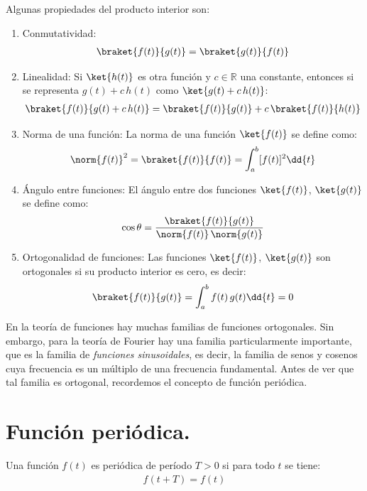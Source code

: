 Algunas propiedades del producto interior son:
\begin{enumerate}[label=\roman*)]
\item Conmutatividad:
\begin{align}
\braket{f(t)}{g(t)} = \braket{g(t)}{f(t)}
\label{eq:ecuacion_06_01_14}
\end{align}
\item Linealidad: Si $\ket{h(t)}$ es otra función y $c \in \mathbb{R}$ una constante, entonces si se representa $g(t) + c \, h(t)$ como $\ket{g(t) + c \, h(t)}$:
\begin{align}
\braket{f(t)}{g(t) + c \, h(t)} = \braket{f(t)}{g(t)} + c \, \braket{f(t)}{h(t)}
\label{eq:ecuacion_06_01_15}
\end{align}
\item Norma de una función: La norma de una función $\ket{f(t)}$ se define como:
\begin{align}
\norm{f(t)}^{2} = \braket{f(t)}{f(t)} = \int_{a}^{b} [f(t)]^{2} \dd{t}
\label{eq:ecuacion_01_06_16}
\end{align}
\item Ángulo entre funciones: El ángulo entre dos funciones $\ket{f(t)}$, $\ket{g(t)}$ se define como:
\begin{align}
\cos \theta = \dfrac{\braket{f(t)}{g(t)}}{\norm{f(t)} \, \norm{g(t)}}
\label{eq:ecuacion_06_01_17}
\end{align}
\item Ortogonalidad de funciones: Las funciones $\ket{f(t)}$, $\ket{g(t)}$ son ortogonales si su producto interior es cero, es decir:
\begin{align}
\braket{f(t)}{g(t)} = \int_{a}^{b} f(t) \, g(t) \dd{t} = 0
\label{eq:ecuacion_06_01_18}
\end{align}
\end{enumerate}

En la teoría de funciones hay muchas familias de funciones ortogonales. Sin embargo, para la teoría de Fourier hay una familia particularmente importante, que es la familia de \emph{funciones sinusoidales}, es decir, la familia de senos y cosenos cuya frecuencia es un múltiplo de una frecuencia fundamental. Antes de ver que tal familia es ortogonal, recordemos el concepto de función periódica.

\section{Función periódica.}

Una función $f(t)$ es periódica de período $T > 0$ si para todo $t$ se tiene:
\begin{align}
f(t + T) = f(t)
\label{eq:ecuacion_06_01_19}
\end{align}

